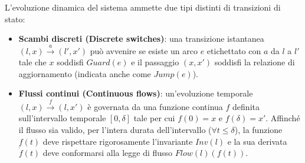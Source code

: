 L'evoluzione dinamica del sistema ammette due tipi distinti di transizioni di stato:
\begin{itemize}
  \item \textbf{Scambi discreti (Discrete switches)}: una transizione istantanea \((l,x) \xrightarrow{a} (l',x')\) può avvenire se esiste un arco \(e\) etichettato con \(a\) da \(l\) a \(l'\) tale che \(x\) soddisfi \(Guard(e)\) e il passaggio \((x,x')\) soddisfi la relazione di aggiornamento (indicata anche come \(Jump(e)\)).
  \item \textbf{Flussi continui (Continuous flows)}: un'evoluzione temporale \((l,x) \xrightarrow{f} (l,x')\) è governata da una funzione continua \(f\) definita sull'intervallo temporale \([0, \delta]\) tale per cui \(f(0) = x\) e \(f(\delta) = x'\). Affinché il flusso sia valido, per l'intera durata dell'intervallo (\(\forall t \leq \delta\)), la funzione \(f(t)\) deve rispettare rigorosamente l'invariante \(Inv(l)\) e la sua derivata \(\dot{f}(t)\) deve conformarsi alla legge di flusso \(Flow(l)(f(t))\).
\end{itemize}